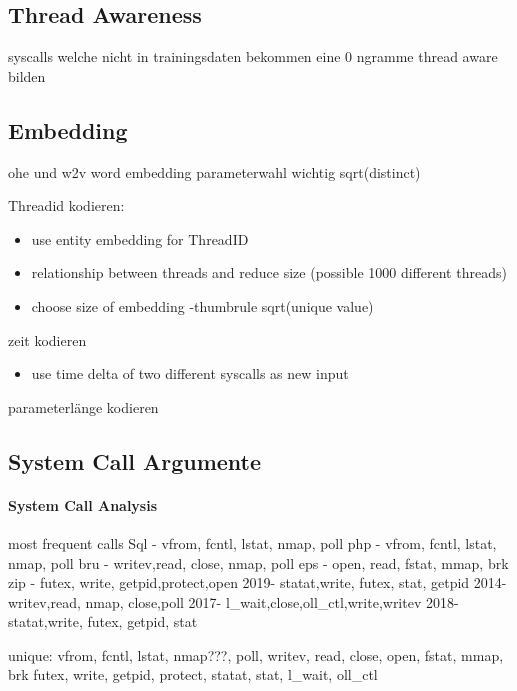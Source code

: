     \subsection{Thread Awareness}
        syscalls welche nicht in trainingsdaten bekommen eine 0
        ngramme thread aware bilden

    \subsection{Embedding}
    \label{sec:embedding}
        ohe und w2v
        word embedding parameterwahl wichtig sqrt(distinct)

        Threadid kodieren: 
        \begin{itemize}
            \item use entity embedding for ThreadID \cite{GUO2016} 
            \item relationship between threads and reduce size (possible 1000 different threads)
            \item choose size of embedding -thumbrule sqrt(unique value) 
        \end{itemize}
        zeit kodieren
        \begin{itemize}
            \item use time delta of two different syscalls as new input
        \end{itemize}
        parameterlänge kodieren

    \subsection{System Call Argumente}
    \label{sec:args}
        \paragraph{System Call Analysis}  
            most frequent calls
            Sql - vfrom, fcntl, lstat, nmap, poll
            php - vfrom, fcntl, lstat, nmap, poll
            bru - writev,read,  close, nmap, poll
            eps - open,  read,  fstat, mmap, brk
            zip - futex, write, getpid,protect,open
            2019- statat,write, futex, stat, getpid
            2014- writev,read,  nmap,  close,poll
            2017- l_wait,close,oll_ctl,write,writev
            2018- statat,write, futex, getpid, stat


            unique:
                vfrom, fcntl, lstat, nmap???, poll, writev, read, close, open, fstat, mmap, brk
                futex, write, getpid, protect, statat, stat, l_wait, oll_ctl

